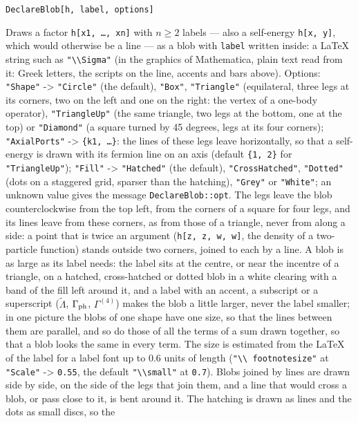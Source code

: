 \documentclass[11pt,a4paper]{article}
\makeatletter
\newcommand{\pkg}[1]{\texttt{#1}}
\newenvironment{function}[1]{\par\if@nobreak\else\medskip\needspace{4\baselineskip}\fi\noindent\phantomsection\label{fn:#1}%
  \begin{fnbox}}{\end{fnbox}\par\nobreak}
\newcommand{\syntax}[1]{\texttt{#1}\par}
\newcommand{\opt}[1]{\texttt{"#1"}}
\makeatother
\begin{document}
\begin{function}{DeclareBlob}
\syntax{DeclareBlob[h, label, options]}
\end{function}
Draws a factor \pkg{h[x1, \dots, xn]} with $n\ge2$ labels --- also a self-energy \pkg{h[x, y]}, which would otherwise be a
line --- as a blob with \pkg{label} written inside: a LaTeX string such as \pkg{"\textbackslash\textbackslash Sigma"} (in
the graphics of Mathematica, plain text read from it: Greek letters, the scripts on the line, accents and bars above).
Options: \opt{Shape} -> \opt{Circle} (the default), \opt{Box}, \opt{Triangle} (equilateral,
three legs at its corners, two on the left and one on the right: the vertex of a one-body operator), \opt{TriangleUp} (the
same triangle, two legs at the bottom, one at the top) or \opt{Diamond} (a square turned by 45 degrees, legs at its four corners);
\opt{AxialPorts} -> \pkg{\{k1, \dots\}}: the lines of these legs leave horizontally, so that a self-energy is drawn with its
fermion line on an axis (default \pkg{\{1, 2\}} for \opt{TriangleUp});
\opt{Fill} -> \opt{Hatched} (the default), \opt{CrossHatched}, \opt{Dotted} (dots on a staggered grid, sparser than the
hatching), \opt{Grey} or \opt{White}; an unknown value gives the message \pkg{DeclareBlob::opt}. The legs leave the blob counterclockwise from the top left, from the corners of a square
for four legs, and its lines leave from these corners, as from those of a triangle, never from along a side: a point
that is twice an argument (\pkg{h[z, z, w, w]}, the density of a two-particle function) stands outside two corners,
joined to each by a line. A blob is as large as its label needs: the label sits at the centre, or near the incentre of a triangle,
on a hatched, cross-hatched or dotted blob in a white clearing with a band of the fill left around it, and a label with an
accent, a subscript or
a superscript ($\tilde\Lambda$, $\Gamma_{\rm ph}$, $\Gamma^{(4)}$) makes the blob a little larger, never the label
smaller; in one picture the blobs of one shape have one size, so that the lines between them are parallel, and so do
those of all the terms of a sum drawn together, so that a blob looks the same in every term. The size is
estimated from the LaTeX of the label for a label font up to 0.6 units of length (\pkg{"\textbackslash\textbackslash
footnotesize"} at \opt{Scale} -> \pkg{0.55}, the default \pkg{"\textbackslash\textbackslash small"} at \pkg{0.7}). Blobs
joined by lines are drawn side by side, on the side of the legs that join them, and a line that would
cross a blob, or pass close to it, is bent around it. The hatching is drawn as lines and the dots as small discs, so the
\end{document}
